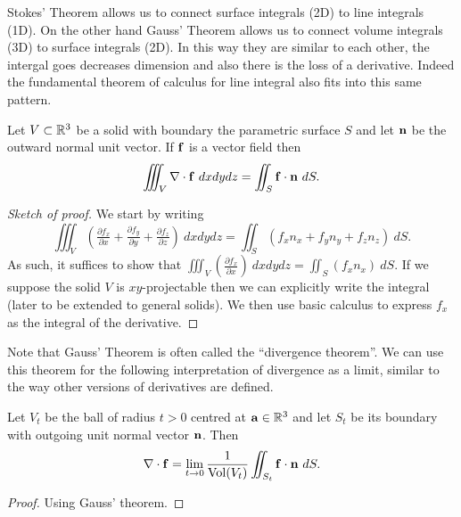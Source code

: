 Stokes' Theorem allows us to connect surface integrals (2D) to line integrals (1D).
On the other hand Gauss' Theorem allows us to connect volume integrals (3D) to surface integrals (2D).
In this way they are similar to each other, the intergal goes decreases dimension and also there is the loss of a derivative.
Indeed the fundamental theorem of calculus for line integral also fits into this same pattern.

\begin{theorem}[Gauss]
    Let \(V \subset \mathbb{R}^3\) be a solid with boundary the parametric surface \(S\) and let \(\mathbf{n}\) be the outward normal unit vector.
    If \(\mathbf{f}\) is a vector field then
    \[
        \iiint_{V} \nabla \cdot \mathbf{f} \ dx dy dz = \iint_{S} \mathbf{f} \cdot \mathbf{n} \ dS.
    \]
\end{theorem}


\begin{proof}[Sketch of proof]
    We start by writing
    \[
        \iiint_V \left(\tfrac{\partial f_x}{\partial x} + \tfrac{\partial f_y}{\partial y} + \tfrac{\partial f_z}{\partial z} \right) \ dx dy dz = \iint_{S} \left(f_x n_x + f_y n_y + f_z n_z\right) \ dS.
    \]
    As such, it suffices to show that \(\iiint_V \left(\frac{\partial f_x}{\partial x}  \right) \ dx dy dz = \iint_{S} \left(f_x n_x \right) \ dS\).
    If we suppose the solid \(V\) is \(xy\)-projectable then we can explicitly write the integral (later to be extended to general solids).
    We then use basic calculus to express \(f_x\) as the integral of the derivative.
\end{proof}

Note that Gauss' Theorem is often called the ``divergence theorem''.
We can use this theorem for the following interpretation of divergence as a limit, similar to the way other versions of derivatives are defined.

\begin{theorem*}
    Let \(V_t\) be the ball of radius \(t>0\) centred at \(\mathbf{a}\in\mathbb{R}^3\)
    and let \(S_t\) be its boundary with outgoing unit normal vector \(\mathbf{n}\).
    Then
    \[
        \nabla\cdot \ff = \lim_{t\to 0} \frac{1}{\operatorname{Vol}(V_t)} \iint_{S_t} \ff \cdot \nn \ dS.
    \]
\end{theorem*}

\begin{proof}
    Using Gauss' theorem.
\end{proof}

